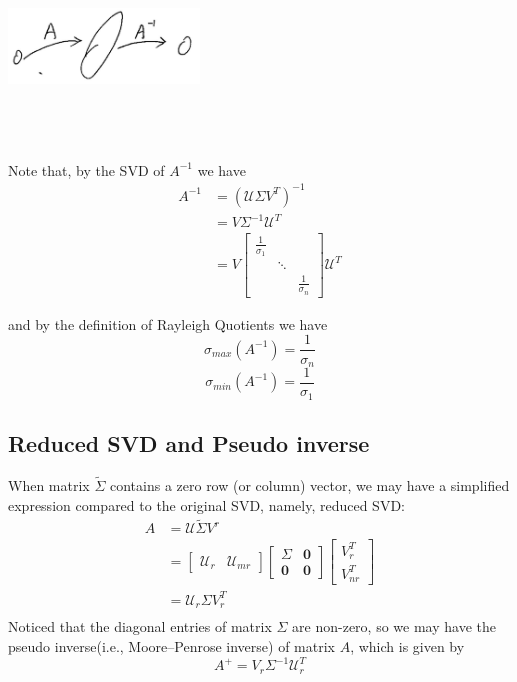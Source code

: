 \begin{marginfigure}
	\centering
	\includegraphics[width=2in,height=2in]{figures/ch05/figure2.jpg}
\end{marginfigure}

Note that, by the SVD of $A^{-1}$ we have
\begin{align*}
A^{-1} 
&= (\mathcal{U}\Sigma V^T)^{-1} \\
&= V\Sigma^{-1}\mathcal{U}^T\\
&= V
\begin{bmatrix}
\frac{1}{\sigma_1} & &\\
& \ddots & \\
& & \frac{1}{\sigma_n}
\end{bmatrix}
\mathcal{U}^T
\end{align*}

and by the definition of Rayleigh Quotients we have 
$$\sigma_{max}(A^{-1}) = \frac{1}{\sigma_n}$$
$$\sigma_{min}(A^{-1}) = \frac{1}{\sigma_1}$$

\subsection{Reduced SVD and Pseudo inverse}
When matrix $\tilde{\Sigma}$ contains a zero row (or column) vector, we may have a simplified expression compared to the original SVD, namely, reduced SVD:
\begin{align*}
A &= \mathcal{U}\tilde{\Sigma}V^r\\
&= 
\begin{bmatrix}
\mathcal{U}_r & \mathcal{U}_{mr}
\end{bmatrix}
\begin{bmatrix}
\Sigma & \mathbf{0}\\
\mathbf{0} & \mathbf{0}
\end{bmatrix}
\begin{bmatrix}
V_r^T\\
V_{nr}^T
\end{bmatrix}\\
&= \mathcal{U}_r\Sigma V_r^T\\
\end{align*}
Noticed that the diagonal entries of matrix $\Sigma$ are non-zero, so we may have the pseudo inverse(i.e., Moore–Penrose inverse) of matrix $A$, which is given by
$$A^{+} = V_r \Sigma^{-1} \mathcal{U}_r^T $$



